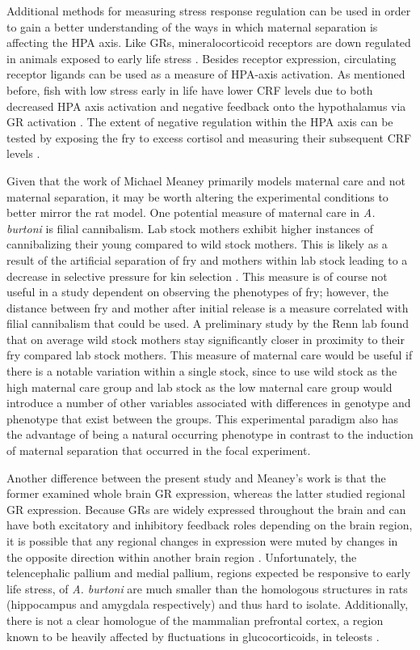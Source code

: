 \documentclass[12pt,twoside]{reedthesis}
\begin{document}
Additional methods for measuring stress response regulation can be used in order
to gain a better understanding of the ways in which maternal separation is
affecting the HPA axis. Like GRs, mineralocorticoid receptors are
down regulated in animals exposed to early life stress \citep{gass_mice_2001}.
Besides receptor expression, circulating receptor ligands can be used
as a measure of HPA-axis activation. As mentioned
before, fish with low stress early in life have lower CRF levels due to both
decreased HPA axis activation and negative feedback onto the hypothalamus via
GR activation \citep{taborsky_stable_2012}. The extent of negative regulation
within the HPA axis can be tested by exposing the fry to excess cortisol and
measuring their subsequent CRF levels \citep{liu_maternal_2000}.

Given that the work of Michael Meaney primarily models maternal care and not
maternal separation, it may be worth altering the experimental conditions to
better mirror the rat model. One potential measure of maternal care in
\textit{A. burtoni} is filial cannibalism. Lab stock mothers exhibit higher
instances of cannibalizing their young compared to wild stock mothers. This is likely as
a result of the artificial separation of fry and mothers within lab stock
leading to a
decrease in selective pressure for kin selection \citep{renn_maternal_2009, lonstein_sensory_2002}. This measure is of course not useful
in a study dependent on observing the phenotypes of fry; however, the distance between fry and mother after initial
release is a measure correlated with filial cannibalism that could be used. A preliminary study by the
Renn lab found that on average wild stock mothers stay significantly closer in proximity to their
fry compared lab stock mothers. This measure of maternal care would be useful if
there is a notable variation within a single stock, since to use wild stock
as the high maternal care group and lab stock as the low maternal care group
would introduce a number of other variables associated with differences in genotype and phenotype that
exist between the groups. This experimental paradigm also has the advantage of being a natural
occurring phenotype in contrast to the induction of maternal
separation that occurred in the focal experiment. 

Another difference between the present study and Meaney's work is that the
former examined whole brain GR expression, whereas the latter studied regional
GR expression. Because GRs are widely expressed throughout the brain and can
have both excitatory and inhibitory feedback roles depending on the brain
region, it is possible that any regional changes in expression were muted by
changes in the opposite direction within another brain region \citep{2017Nrid,
  herman_limbic_2005}. Unfortunately, the telencephalic pallium and medial
pallium, regions expected be responsive to early life stress, of
\textit{A. burtoni} are much smaller than the homologous structures in rats
(hippocampus and amygdala respectively) and thus hard to isolate. Additionally,
there is not a clear homologue of the mammalian prefrontal cortex, a region
known to be heavily affected by fluctuations in glucocorticoids, in teleosts
\citep{lupien_effects_2009, yamamoto_studies_2009}. 
\end{document}

